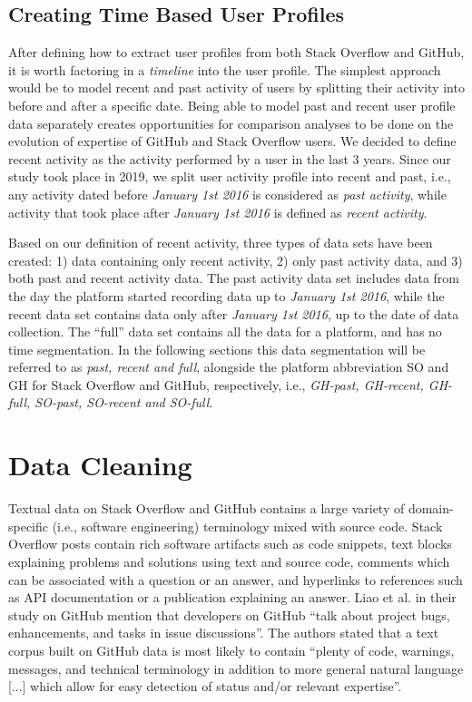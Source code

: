     \subsection{Creating Time Based User Profiles} \label{past_recent_full_segm}
        After defining how to extract user profiles from both Stack Overflow and GitHub, it is worth factoring in a \textit{timeline} into the user profile. The simplest approach would be to model recent and past activity of users by splitting their activity into before and after a specific date. Being able to model past and recent user profile data separately creates opportunities for comparison analyses to be done on the evolution of expertise of GitHub and Stack Overflow users. We decided to define recent activity as the activity performed by a user in the last 3 years. Since our study took place in 2019, we split user activity profile into recent and past, i.e., any activity dated before \textit{January 1st 2016} is considered as \textit{past activity}, while activity that took place after \textit{January 1st 2016} is defined as \textit{recent activity}. 
        
        Based on our definition of recent activity, three types of data sets have been created: 1) data containing only recent activity, 2) only past activity data, and 3) both past and recent activity data. The past activity data set includes data from the day the platform started recording data up to \textit{January 1st 2016}, while the recent data set contains data only after \textit{January 1st 2016}, up to the date of data collection. The ``full'' data set contains all the data for a platform, and has no time segmentation. In the following sections this data segmentation will be referred to as \emph{past, recent and full}, alongside the platform abbreviation SO and GH for Stack Overflow and GitHub, respectively, i.e.,  \emph{GH-past, GH-recent, GH-full, SO-past, SO-recent and SO-full}.

\section{Data Cleaning\label{sec:data_cleaning}}

    Textual data on Stack Overflow and GitHub contains a large variety of domain-specific (i.e., software engineering) terminology mixed with source code. Stack Overflow posts contain rich software artifacts such as code snippets, text blocks explaining problems and solutions using text and source code, comments which can be associated with a question or an answer, and hyperlinks to references such as API documentation or a publication explaining an answer. Liao et al. \cite{liao2019status} in their study on GitHub mention that developers on GitHub ``talk about project bugs, enhancements, and tasks in issue discussions''. The authors stated that a text corpus built on GitHub data is most likely  to contain ``plenty of code, warnings, messages, and technical terminology in addition to more general natural language [...] which allow for easy detection of status and/or relevant expertise''.
    
